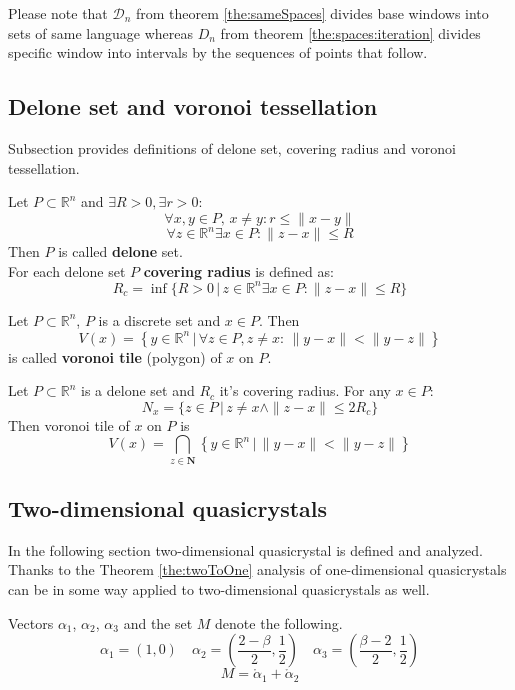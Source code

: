 \documentclass[text.tex]{subfiles}
\begin{document}
\begin{remark}
Please note that $\mathcal{D}_n$ from theorem \ref{the:sameSpaces} divides base windows into sets of same language whereas $D_n$ from theorem \ref{the:spaces:iteration} divides specific window into intervals by the sequences of points that follow.
\end{remark}


\subsection*{Delone set and voronoi tessellation}

Subsection provides definitions of delone set, covering radius and voronoi tessellation.

\begin{definition}
\label{def:delone}
Let $P\subset \mathbb{R}^n$ and $\exists R>0, \exists r>0$:
$$\forall x,y\in P,\, x\neq y: r\leq \|x-y\|$$
$$\forall z\in\mathbb{R}^n \exists x\in P: \|z-x\|\leq R$$
Then $P$ is called \textbf{delone} set.\\
For each delone set $P$ \textbf{covering radius} is defined as:
$$R_c = \inf\{R>0\,|\, z\in\mathbb{R}^n \exists x\in P: \|z-x\|\leq R\}$$
\end{definition}

\begin{definition}
Let $P\subset \mathbb{R}^n$, $P$ is a discrete set and $x\in P$. Then
$$V(x) = \left\{ y \in \mathbb{R}^n \,|\, \forall z \in P, z\neq x:\, \|y-x\|<\|y-z\| \right\}$$
is called \textbf{voronoi tile} (polygon) of $x$ on $P$.
\end{definition}

\begin{theorem}
\label{the:radiusLimit}
Let $P\subset \mathbb{R}^n$ is a delone set and $R_c$ it's covering radius. For any $x\in P$:
$$N_x = \{z\in P\,|\, z\neq x \wedge \|z-x\|\leq 2R_c\}$$
Then voronoi tile of $x$ on $P$ is
$$V(x) = \bigcap_{z\in \boldsymbol{N}} \left\{ y \in \mathbb{R}^n \,|\, \|y-x\|<\|y-z\| \right\}$$
\end{theorem}

\subsection{Two-dimensional quasicrystals}%
\label{sec:twoDimension}
In the following section two-dimensional quasicrystal is defined and analyzed. Thanks to the Theorem \ref{the:twoToOne} analysis of one-dimensional quasicrystals can be in some way applied to two-dimensional quasicrystals as well. 
\begin{definition}
Vectors $\alpha_1$, $\alpha_2$, $\alpha_3$ and the set $M$ denote the following.
$$\alpha_1 = \left( 1,0 \right) \quad \alpha_2 = \left( \frac{2-\beta}{2}, \frac{1}{2} \right) \quad \alpha_3 = \left( \frac{\beta-2}{2}, \frac{1}{2} \right)$$
$$M = \ring\alpha_1 + \ring\alpha_2$$
\end{definition}
\end{document}
